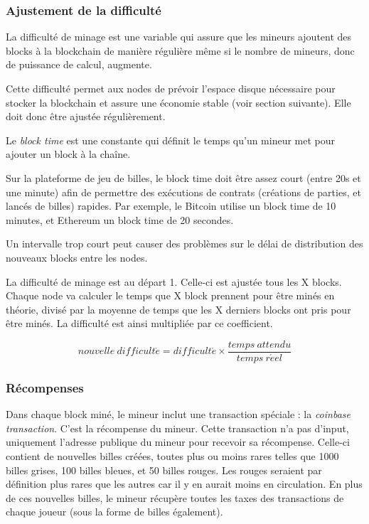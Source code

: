 \documentclass{article}
\begin{document}
\subsubsection{Ajustement de la difficulté}

La difficulté de minage est une variable qui assure que les mineurs ajoutent des blocks à la blockchain de manière régulière même si le nombre de mineurs, donc de puissance de calcul, augmente.
 
Cette difficulté permet aux nodes de prévoir l’espace disque nécessaire pour stocker la blockchain et assure une économie stable (voir section suivante). Elle doit donc être ajustée régulièrement.

Le \textit{block time} est une constante qui définit le temps qu’un mineur met pour ajouter un block à la chaîne.

Sur la plateforme de jeu de billes, le block time doit être assez court (entre 20s et une minute) afin de permettre des exécutions de contrats (créations de parties, et lancés de billes) rapides. Par exemple, le Bitcoin utilise un block time de 10 minutes, et Ethereum un block time de 20 secondes.

Un intervalle trop court peut causer des problèmes sur le délai de distribution des nouveaux blocks entre les nodes.

La difficulté de minage est au départ 1. Celle-ci est ajustée tous les X
blocks. Chaque node va calculer le temps que X block prennent pour être minés en théorie, divisé par la moyenne de temps que les X derniers blocks ont pris pour être minés. La difficulté est ainsi multipliée par ce coefficient.

\[ nouvelle\ difficult\acute{e} = difficult\acute{e} \times \frac{temps\ attendu}{temps\ r\acute{e}el} \]

\subsubsection{Récompenses}
Dans chaque block miné, le mineur inclut une transaction spéciale : la \textit{coinbase transaction}. C'est la récompense du mineur.
Cette transaction n'a pas d'input, uniquement l'adresse publique du mineur pour recevoir sa récompense.
Celle-ci contient de nouvelles billes créées, toutes plus ou moins rares telles que 1000 billes grises, 100 billes bleues, et 50 billes rouges. Les rouges seraient par définition plus rares que les autres car il y en aurait moins en circulation.
En plus de ces nouvelles billes, le mineur récupère toutes les taxes des transactions de chaque joueur (sous la forme de billes également).
\end{document}
